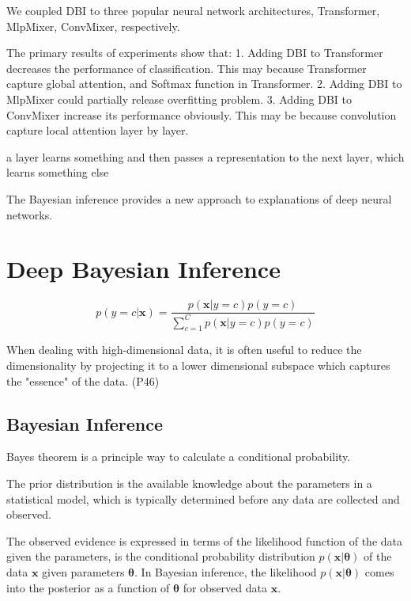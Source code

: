 \documentclass{article}
\begin{document}
We coupled DBI to three popular neural network architectures, Transformer, MlpMixer, ConvMixer, respectively.

The primary results of experiments show that:
1. Adding DBI to Transformer decreases the performance of classification. This may because Transformer capture global attention, and Softmax function in Transformer.
2. Adding DBI to MlpMixer could partially release overfitting problem.
3. Adding DBI to ConvMixer increase its performance obviously. This may be because convolution capture local attention layer by layer.

a layer learns something and then passes a representation to the next layer, which learns something else


The Bayesian inference provides a new approach to explanations of deep neural networks.

\section{Deep Bayesian Inference}



\begin{equation}
  p(y=c|\bm{x}) = \frac{p(\bm{x}|y=c)p(y=c)}{\sum_{c=1}^C p(\bm{x}|y=c)p(y=c)}
\end{equation}


When dealing with high-dimensional data, it is often useful to reduce the dimensionality by projecting it to a lower dimensional subspace which captures the "essence" of the data. (P46)

\subsection{Bayesian Inference}

Bayes theorem is a principle way to calculate a conditional probability.

The prior distribution is the available knowledge about the parameters in a statistical model, which is typically determined before any data are collected and observed. 

The observed evidence is expressed in terms of the likelihood function of the data given the parameters, is the conditional probability distribution $p(\bm{x}|\bm{\theta})$ of  the data $\bm{x}$ given parameters $\bm{\theta}$. 
In Bayesian inference, the likelihood $p(\bm{x}|\bm{\theta})$ comes into the posterior as a function of $\bm{\theta}$ for observed data $\bm{x}$. \citep{van2021bayesian}
\end{document}
